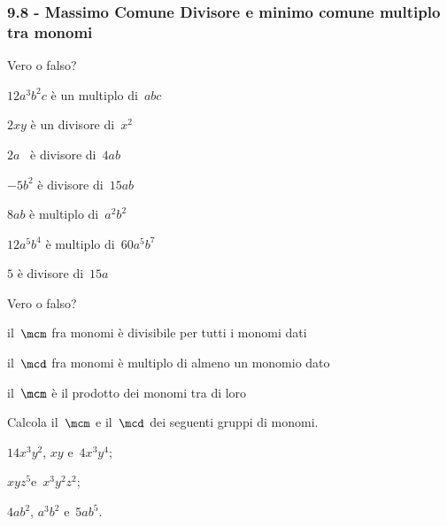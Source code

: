 \subsubsection*{9.8 - Massimo Comune Divisore e minimo comune multiplo tra monomi}

\begin{esercizio}
 \label{ese:9.43}
Vero o falso?

\TabPositions{9cm}
\begin{enumeratea}
\item $12a^{3}b^{2}c$ è un multiplo di~$abc$ \tab\boxV\quad\boxF
\item $2xy$ è un divisore di~$x^{2}$ \tab\boxV\quad\boxF
\item $2a$ \ è divisore di~$4ab$ \tab\boxV\quad\boxF
\item $-5b^{2}$ è divisore di~$15ab$ \tab\boxV\quad\boxF
\item $8ab$ è multiplo di~$a^{2}b^{2}$ \tab\boxV\quad\boxF
\item $12a^{5}b^{4}$ è multiplo di~$60a^{5}b^{7}$ \tab\boxV\quad\boxF
\item $5$ è divisore di~$15a$ \tab\boxV\quad\boxF
\end{enumeratea}
\end{esercizio}

\begin{esercizio}
 \label{ese:9.44}
Vero o falso?

\TabPositions{10cm}
\begin{enumeratea}
\item il~$\mcm$ fra monomi è divisibile per tutti i monomi dati \tab\boxV\quad\boxF
\item il~$\mcd$ fra monomi è multiplo di almeno un monomio dato \tab\boxV\quad\boxF
\item il~$\mcm$ è il prodotto dei monomi tra di loro \tab\boxV\quad\boxF
\end{enumeratea}
\end{esercizio}

\begin{esercizio}[\Ast]
 \label{ese:9.45}
Calcola il~$\mcm$ e il~$\mcd$ dei seguenti gruppi di monomi.

\begin{enumeratea}
 \item $14x^{3}y^{2}$, $xy$ e~$4x^{3}y^{4}$;
 \item $xyz^{5}$e~$x^{3}y^{2}z^{2}$;
 \item $4ab^{2}$, $a^{3}b^{2}$ e~$5ab^{5}$.
\end{enumeratea}
\end{esercizio}

